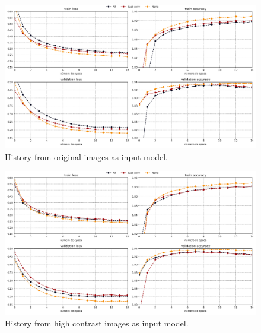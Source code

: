 \begin{frame}
  \begin{figure}[H]
    \includegraphics[width=14cm]{Graphics/normal_history.png}
    \caption{History from original images as input model.}
  \end{figure}
\end{frame}

\begin{frame}
  \begin{figure}[H]
    \includegraphics[width=14cm]{Graphics/high_contrast/history.png}
    \caption{History from high contrast images as input model.}
  \end{figure}
\end{frame}

